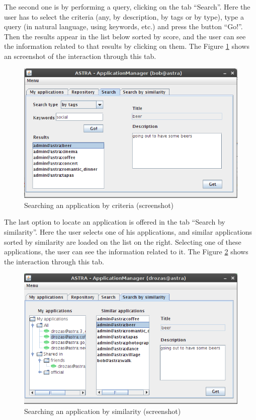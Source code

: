 The second one is by performing a query, clicking on the tab ``Search''.
Here the user has to select the criteria (any, by description, by tags or by type),
type a query (in natural language, using keywords, etc.) and press the button
``Go!''. Then the results appear in the list below sorted by score, and the
user can see the information related to that results by clicking on them. The
Figure \ref{img:ui-searching-criteria} shows an screenshot of the interaction
through this tab.

\begin{figure}[h!]
 \begin{center}
 \includegraphics[scale=0.6]{screenshots/ui-searching-criteria.png}
  \caption{\label{img:ui-searching-criteria}Searching an application by  
  criteria (screenshot)}
 \end{center}
\end{figure}

The last option to locate an application is offered in the tab ``Search by
similarity''. Here the user selects one of his applications, and similar
applications sorted by similarity are loaded on the list on the right. Selecting
one of these applications, the user can see the information related to it. The
Figure \ref{img:ui-searching-similarity} shows the interaction through this tab.

\begin{figure}[h!]
 \begin{center}
 \includegraphics[scale=0.6]{screenshots/ui-searching-similarity.png}
  \caption{\label{img:ui-searching-similarity}Searching an application by 
 similarity (screenshot)}
 \end{center}
\end{figure}

